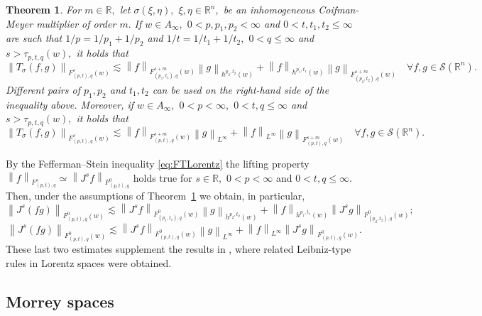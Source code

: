 \documentclass[10pt,a4paper]{article}
\newtheorem{theorem}{Theorem}[section]
\theoremstyle{remark}
\newcommand{\re}{\mathbb{R}}
\newcommand{\rn}{{{\mathbb R}^n}}
\newcommand{\sw}{{\mathcal{S}}(\rn)}
\newcommand{\itlw}[4]{F_{#1,#3}^{#2}(#4)} %
\newcommand{\itl}[3]{F_{#1,#3}^{#2}} %
\newcommand{\norm}[2]{\left\|#1\right\|_{#2}}
\newcommand{\hcline}{1/p=1/p_1+1/p_2}
\begin{document}
\begin{theorem}\label{thm:ICM:Lorentz}  For $m \in \re,$ let $\sigma(\xi,\eta),$ $\xi,\eta\in\rn,$ be an inhomogeneous Coifman-Meyer multiplier of order $m.$ If $w\in A_\infty,$ $0 < p, p_1, p_2 < \infty$ and $0 < t, t_1, t_2\le \infty$  are  such that $\hcline$ and $1/t=1/t_1+1/t_2,$  $0 < q \le \infty$  and  $s > \tau_{p,t,q}(w),$  it holds that
\begin{equation*}
\norm{T_\sigma(f,g)}{\itlw{(p,t)}{s}{q}{w}} \lesssim \norm{f}{\itlw{(p_1,t_1)}{s+m}{q}{w}} \norm{g}{h^{p_2,t_2}(w)} +  \norm{f}{h^{p_1,t_1}(w)}   \norm{g}{\itlw{(p_2,t_2)}{s+m}{q}{w}} \quad \forall f, g \in \sw.
\end{equation*}
Different pairs of $p_1,p_2$ and $t_1, t_2$ can be used on the right-hand side of the inequality above. 
Moreover, if $w\in A_\infty,$ $0<p<\infty,$ $0<t,q\le \infty$   and $s > \tau_{p,t,q}(w),$  it holds that
\begin{equation*}
\norm{T_\sigma(f,g)}{\itlw{(p,t)}{s}{q}{w}} \lesssim \norm{f}{\itlw{(p,t)}{s+m}{q}{w}} \norm{g}{L^\infty} +  \norm{f}{L^\infty}   \norm{g}{\itlw{(p,t)}{s+m}{q}{w}} \quad \forall f, g \in \sw.
\end{equation*}
\end{theorem}
 
By the Fefferman--Stein inequality \eqref{eq:FTLorentz} the lifting property $ \norm{f}{\itl{(p,t)}{s}{q}}\simeq\norm{J^s f}{\itl{(p,t)}{0}{q}}$ holds true for $s \in \re,$ $0<p<\infty$ and  $0<t, q\le \infty.$ 
Then, under the assumptions of Theorem~\ref{thm:ICM:Lorentz}  we obtain, in particular,
\begin{equation*}
\norm{J^s (fg)}{\itl{(p,t)}{0}{q}(w)} \lesssim \norm{J^s f}{\itl{(p_1,t_1)}{0}{q}(w)} \norm{g}{h^{p_2,t_2}(w)} +  \norm{f}{h^{p_1,t_1}(w)}   \norm{J^sg}{\itl{(p_2,t_2)}{0}{q}(w)};
\end{equation*}
\begin{equation*}
\norm{J^s(fg)}{\itlw{(p,t)}{0}{q}{w}} \lesssim \norm{J^sf}{\itlw{(p,t)}{0}{q}{w}} \norm{g}{L^\infty} +  \norm{f}{L^\infty}   \norm{J^s g}{\itlw{(p,t)}{0}{q}{w}}.
\end{equation*}
These last two estimates supplement the results in \cite[Theorem 6.1]{MR3513582}, where related Leibniz-type rules in Lorentz spaces were obtained.
 \subsection{Morrey spaces}
 
\end{document}
